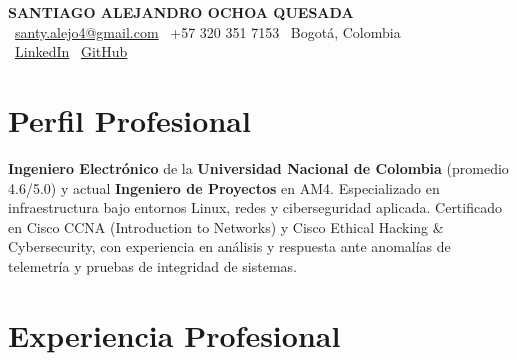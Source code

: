 \documentclass[11pt,a4paper]{article}
\begin{document}
\thispagestyle{empty}
\color{darktext}

\begin{center}
    {\Huge \bfseries\color{accent} SANTIAGO ALEJANDRO OCHOA QUESADA} \\[6pt]
    {\small\color{darktext}
    \faEnvelope\ \href{mailto:santy.alejo4@gmail.com}{santy.alejo4@gmail.com}
    \quad\textcolor{bulletline}{\textbar}\quad
    \faPhone\ +57 320 351 7153
    \quad\textcolor{bulletline}{\textbar}\quad
    \faMapMarker*\ Bogotá, Colombia \\[4pt]
    \faLinkedin\ \href{https://linkedin.com/in/santiago-alejandro-ochoa-quesada-a07a18288/}{LinkedIn}
    \quad\textcolor{bulletline}{\textbar}\quad
    \faGithub\ \href{https://github.com/Sochoaq}{GitHub}
    }
\end{center}
\vspace{4pt}

\section{Perfil Profesional}
\textbf{\textbf{\textbf{\textbf{Ingeniero Electrónico}}}} de la \textbf{\textbf{\textbf{\textbf{Universidad Nacional de Colombia}}}} (promedio 4.6/5.0) y actual \textbf{\textbf{\textbf{\textbf{Ingeniero de Proyectos}}}} en AM4. Especializado en infraestructura bajo entornos Linux, redes y ciberseguridad aplicada. Certificado en Cisco CCNA (Introduction to Networks) y Cisco Ethical Hacking \& Cybersecurity, con experiencia en análisis y respuesta ante anomalías de telemetría y pruebas de integridad de sistemas.

\section{Experiencia Profesional}
\end{document}
